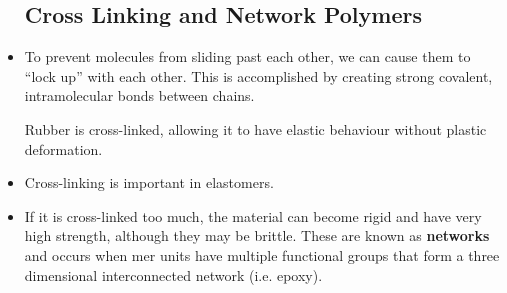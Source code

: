 \begin{itemize}
    \subsection{Cross Linking and Network Polymers}
    \item To prevent molecules from sliding past each other, we can cause them to ``lock up'' with each other. This is accomplished by creating strong covalent, intramolecular bonds between chains.
    \begin{case}
        Rubber is cross-linked, allowing it to have elastic behaviour without plastic deformation.
    \end{case}
    \item Cross-linking is important in elastomers.
    \item If it is cross-linked too much, the material can become rigid and have very high strength, although they may be brittle. These are known as \textbf{networks} and occurs when mer units have multiple functional groups that form a three dimensional interconnected network (i.e. epoxy).

\end{itemize}
